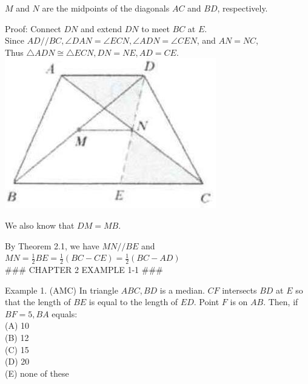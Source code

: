 \documentclass[10pt]{article}
\begin{document}
\(M\) and \(N\) are the midpoints of the diagonals \(A C\) and \(B D\), respectively.

Proof:
Connect \(D N\) and extend \(D N\) to meet \(B C\) at \(E\).\\
Since \(A D / / B C, \angle D A N=\angle E C N, \angle A D N=\angle C E N\), and \(A N=N C\),\\
Thus \(\triangle A D N \cong \triangle E C N, D N=N E, A D=C E\).\\
\includegraphics[max width=\textwidth, center]{2025_04_17_97bc1f7e44d93c271a88g-035(3)}

We also know that \(D M=M B\).

By Theorem 2.1, we have \(M N / / B E\) and\\
\(M N=\frac{1}{2} B E=\frac{1}{2}(B C-C E)=\frac{1}{2}(B C-A D)\)\\

### CHAPTER 2 EXAMPLE 1-1 ###

Example 1. (AMC) In triangle \(A B C, B D\) is a median. \(C F\) intersects \(B D\) at \(E\) so that the length of \(B E\) is equal to the length of \(E D\). Point \(F\) is on \(A B\). Then, if \(B F=5, B A\) equals:\\
(A) 10\\
(B) 12\\
(C) 15\\
(D) 20\\
(E) none of these
\end{document}
